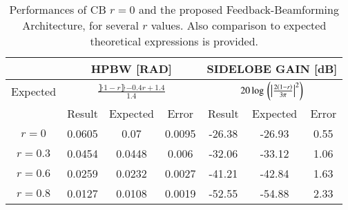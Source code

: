\begin{table}[h!]
    \caption{Performances of CB $r=0$ and the proposed Feedback-Beamforming Architecture, for several $r$ values.
    Also comparison to expected theoretical expressions is provided.}
    \centering
    {
        \begin{tabular}{||c | c c c | c c c||}
            \hline
            & \multicolumn{3}{c|}{HPBW [RAD]} & \multicolumn{3}{c||}{SIDELOBE GAIN [dB]} \\ [0.5ex]
            \hline
            Expected & \multicolumn{3}{c|}{$\frac{\rBrace{1-r}\rBrace{-0.4r+1.4}}{1.4}$} & \multicolumn{3}{c||}{$20\log{}\left({\left\vert\frac{2\left({1-r}\right)}{3\pi}\right\vert^{2}}\right)$} \\ [0.5ex]
            \hline
            & Result & Expected & Error & Result & Expected & Error \\ [0.5ex] 
            \hline\hline
            $r=0$ & 0.0605 & 0.07 & 0.0095 & -26.38 & -26.93 & 0.55 \\ [0.5ex]
            $r=0.3$ & 0.0454 & 0.0448 & 0.006 & -32.06 & -33.12 & 1.06 \\ [0.5ex]
            $r=0.6$ & 0.0259 & 0.0232 & 0.0027 & -41.21 & -42.84 & 1.63 \\ [0.5ex]
            $r=0.8$ & 0.0127 & 0.0108 & 0.0019 & -52.55 & -54.88 & 2.33 \\ [0.5ex]
            \hline
         \end{tabular}
     }
    \label{table_arrayPerfEmp}
\end{table}